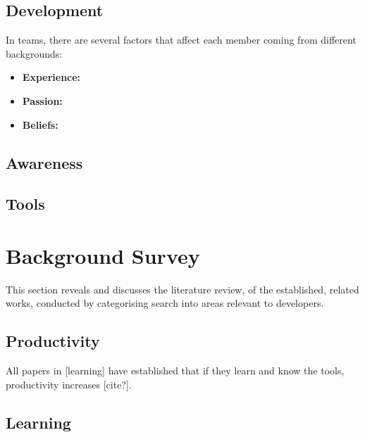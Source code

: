 \documentclass{mprop}
\begin{document}
\subsection{Development}

In teams, there are several factors that affect each member coming from different backgrounds:

\begin{itemize}
    \item \textbf{Experience:}
    \item \textbf{Passion:}
    \item \textbf{Beliefs:}
\end{itemize}

\subsection{Awareness}%

\subsection{Tools}

\section{Background Survey}


This section reveals and discusses the literature review, of the established, related works, conducted by categorising search into areas relevant to developers.

\subsection{Productivity}


All papers in [learning] have established that if they learn and know the tools, productivity increases [cite?].

\subsection{Learning}
\end{document}
